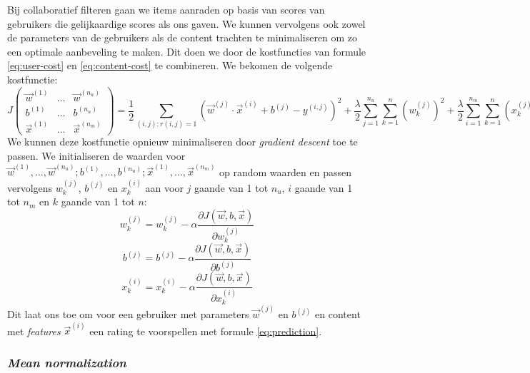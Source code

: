 Bij collaboratief filteren gaan we items aanraden op basis van scores van gebruikers die gelijkaardige scores als ons gaven. We kunnen vervolgens ook  zowel de parameters van de gebruikers als de content trachten te minimaliseren om zo een optimale aanbeveling te maken. Dit doen we door de kostfuncties van formule \ref{eq:user-cost} en  \ref{eq:content-cost} te combineren. We bekomen de volgende kostfunctie:
\begin{equation}
	J \begin{pmatrix} \vec{w}^{(1)} & \ldots & \vec{w}^{(n_{u})} \\ b^{(1)} & \ldots & b^{(n_{u})} \\ \vec{x}^{(1)} & \ldots & \vec{x}^{(n_{m})} \end{pmatrix} 
	= \frac{1}{2} \sum_{(i, j):r(i, j) = 1} (\vec{w}^{(j)} \cdot \vec{x}^{(i)} + b^{(j)} - y^{(i, j)})^{2} 
	+ \frac{\lambda}{2} \sum_{j=1}^{n_{u}} \sum_{k=1}^{n}(w_{k}^{(j)})^{2}
	+ \frac{\lambda}{2} \sum_{i=1}^{n_{m}} \sum_{k=1}^{n}(x_{k}^{(j)})^{2}
\end{equation}
\noindent
We kunnen deze kostfunctie opnieuw minimaliseren door \textit{gradient descent} toe te passen. We initialiseren de waarden voor $\vec{w}^{(1)}, \ldots, \vec{w}^{(n_{u})}; b^{(1)}, \ldots, b^{(n_{u})}; \vec{x}^{(1)}, \ldots, \vec{x}^{(n_{m})}$ op random waarden en passen vervolgens $w_{k}^{(j)}$, $b^{(j)}$ en $x_{k}^{(i)}$ aan voor $j$ gaande van 1 tot $n_{u}$, $i$ gaande van 1 tot $n_{m}$ en $k$ gaande van 1 tot $n$:
\begin{equation}
	w_{k}^{(j)} = w_{k}^{(j)} - \alpha \frac{\partial J(\vec{w}, b, \vec{x})}{\partial w_{k}^{(j)}}
\end{equation}
\begin{equation}
	b^{(j)} = b^{(j)} - \alpha \frac{\partial J(\vec{w}, b, \vec{x})}{\partial b^{(j)}}
\end{equation}
\begin{equation}
	x_{k}^{(i)} = x_{k}^{(i)} - \alpha \frac{\partial J(\vec{w}, b, \vec{x})}{\partial x_{k}^{(i)}}
\end{equation}
\noindent
Dit laat ons toe om voor een gebruiker met parameters $\vec{w}^{(j)}$ en $b^{(j)}$ en content met \textit{features} $\vec{x}^{(i)}$ een rating te voorspellen met formule \ref{eq:prediction}.

\subsubsection{\textit{Mean normalization}}

